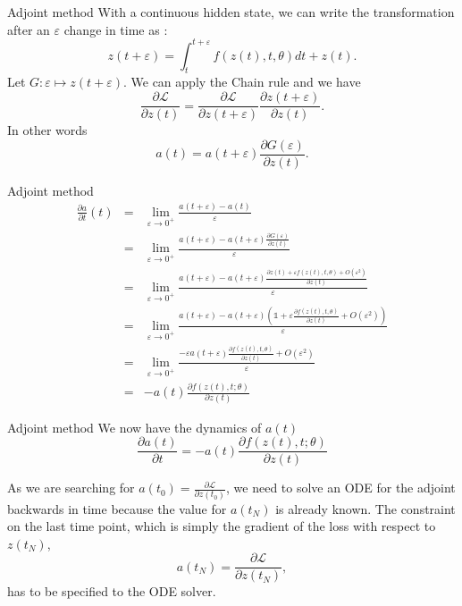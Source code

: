 \documentclass[11pt]{beamer}
\begin{document}
\begin{frame}{Adjoint method}
With a continuous hidden state, we can write the transformation after an $\varepsilon$ change in time as :
\begin{equation}
\label{zteps}
z(t+\varepsilon) = \int^{t+\varepsilon}_{t} f(z(t),t,\theta) dt + z(t).
\end{equation}
Let $ G : \varepsilon \mapsto z(t+\varepsilon)$. We can apply the Chain rule and we have 
\begin{equation*}
\frac{\partial \mathcal{L}}{\partial z(t)} = \frac{\partial \mathcal{L}}{\partial z(t+\varepsilon)} \frac{\partial z(t+\varepsilon)}{\partial z(t)}.
\end{equation*}
In other words 
\begin{equation}
\label{at}
a(t) = a(t+\varepsilon)\frac{\partial G(\varepsilon)}{\partial z(t)}.
\end{equation}
\end{frame}

\begin{frame}{Adjoint method}
\begin{eqnarray*}
\frac{\partial a}{\partial t}(t) &=& \lim_{\varepsilon \rightarrow 0^+} \frac{a(t+\varepsilon) - a(t)}{\varepsilon}\\
&=& \lim_{\varepsilon \rightarrow 0^+} \frac{a(t+\varepsilon) - a(t+\varepsilon)\frac{\partial G(\varepsilon)}{\partial z(t)}}{\varepsilon}\\
&=& \lim_{\varepsilon \rightarrow 0^+} \frac{a(t+\varepsilon) - a(t+\varepsilon)\frac{\partial z(t) + \varepsilon f(z(t),t,\theta) + O(\varepsilon^2)}{\partial z(t)}}{\varepsilon} \\
&=& \lim_{\varepsilon \rightarrow 0^+} \frac{a(t+\varepsilon) - a(t+\varepsilon)(\mathds{1} + \varepsilon \frac{\partial f(z(t),t,\theta)} {\partial z(t)}+ O(\varepsilon^2))}{\varepsilon}\\
&=& \lim_{\varepsilon \rightarrow 0^+} \frac{-\varepsilon a(t+\varepsilon) \frac{\partial f(z(t),t,\theta)} {\partial z(t)}+ O(\varepsilon^2)}{\varepsilon}\\
&=& -a(t)\frac{\partial f(z(t),t;\theta)} {\partial z(t)}
\end{eqnarray*}
\end{frame}

\begin{frame}{Adjoint method}
We now have the dynamics of $a(t)$
\begin{equation}
\label{dynat}
\frac{\partial a(t)}{\partial t} = -a(t)\frac{\partial f(z(t),t;\theta)} {\partial z(t)}
\end{equation}
 
As we are searching for $ a(t_0) = \frac{\partial \mathcal{L}}{\partial z(t_0)}$, we need to solve an ODE for the adjoint backwards in time because the value for $a(t_N)$ is already known. The constraint on the last time point, which is simply the gradient of the loss with respect to $z(t_N)$, 
\begin{equation*}
a(t_N) = \frac{\partial \mathcal{L}}{\partial z(t_N)},
\end{equation*}
has to be specified to the ODE solver. 
\end{frame}
\end{document}
